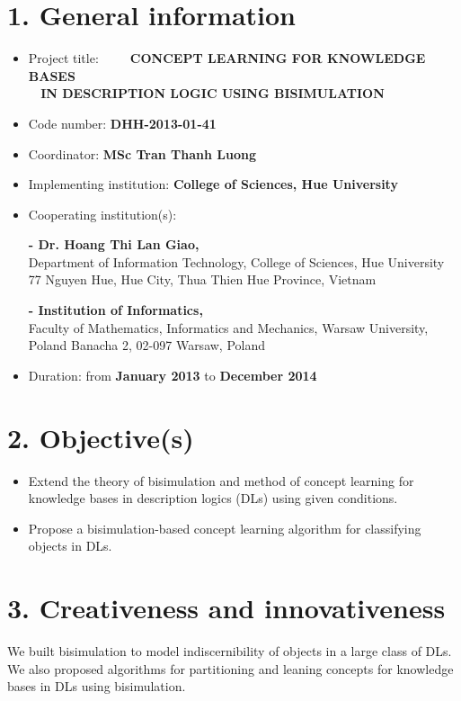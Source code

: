 \section*{1. General information}
\begin{itemize}
	\item Project title:~~~~~\textbf{CONCEPT LEARNING FOR KNOWLEDGE BASES\\ \mbox{~}\hspace{14.7ex} IN DESCRIPTION LOGIC USING BISIMULATION}\\[-0.8cm]
	\item Code number: {\bf DHH-2013-01-41}\\[-0.8cm]
	\item Coordinator: {\bf MSc Tran Thanh Luong}\\[-0.8cm]
	\item Implementing institution: {\bf College of Sciences, Hue University}\\[-0.8cm]
	\item Cooperating institution(s):
	
	{\bf - Dr. Hoang Thi Lan Giao,}\\
	Department of Information Technology, College of Sciences, Hue University\\
	77 Nguyen Hue, Hue City, Thua Thien Hue Province, Vietnam
	
	{\bf - Institution of Informatics,}\\
	Faculty of Mathematics, Informatics and Mechanics, Warsaw University, Poland
	Banacha 2, 02-097 Warsaw, Poland\\[-0.8cm]
	\item Duration: from {\bf January 2013} to {\bf December 2014}
\end{itemize}
\section*{2. Objective(s)}	
\begin{itemize}
	\item Extend the theory of bisimulation and method of concept learning for knowledge bases in description logics (DLs) using given conditions. 

	\item Propose a bisimulation-based concept learning algorithm for classifying objects in DLs.
\end{itemize}
\section*{3. Creativeness and innovativeness}
We built bisimulation to model indiscernibility of objects in a large class of DLs. We also proposed algorithms for partitioning and leaning concepts for knowledge bases in DLs using bisimulation.
